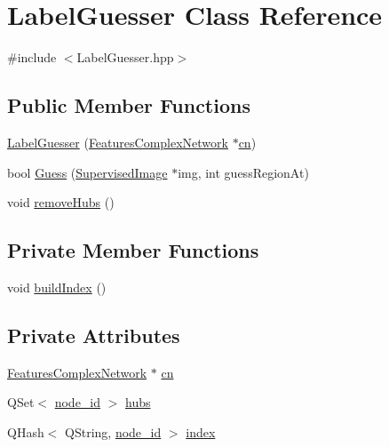 \hypertarget{class_label_guesser}{\section{Label\+Guesser Class Reference}
\label{class_label_guesser}
}


{\ttfamily \#include $<$Label\+Guesser.\+hpp$>$}

\subsection*{Public Member Functions}
\begin{DoxyCompactItemize}
\item 
\hyperlink{class_label_guesser_ad40858173b453bf95a7cd9798ff6a941}{Label\+Guesser} (\hyperlink{class_features_complex_network}{Features\+Complex\+Network} $\ast$\hyperlink{class_label_guesser_acdd5ba09b2a6aa6fadc4b64798bd4e75}{cn})
\item 
bool \hyperlink{class_label_guesser_a83c7361e8308a2347814a418c6165615}{Guess} (\hyperlink{class_supervised_image}{Supervised\+Image} $\ast$img, int guess\+Region\+At)
\item 
void \hyperlink{class_label_guesser_a34aabd99a651c08cd66df1ffa27767e5}{remove\+Hubs} ()
\end{DoxyCompactItemize}
\subsection*{Private Member Functions}
\begin{DoxyCompactItemize}
\item 
void \hyperlink{class_label_guesser_a28aeaaf6c7b4d8faeed2cd2f69da49a3}{build\+Index} ()
\end{DoxyCompactItemize}
\subsection*{Private Attributes}
\begin{DoxyCompactItemize}
\item 
\hyperlink{class_features_complex_network}{Features\+Complex\+Network} $\ast$ \hyperlink{class_label_guesser_acdd5ba09b2a6aa6fadc4b64798bd4e75}{cn}
\item 
Q\+Set$<$ \hyperlink{_complex_network_v2_8hpp_a8323334ca788fde39682469321590d52}{node\+\_\+id} $>$ \hyperlink{class_label_guesser_a9a1306e306ecf90e6d886a45a1ed16f7}{hubs}
\item 
Q\+Hash$<$ Q\+String, \hyperlink{_complex_network_v2_8hpp_a8323334ca788fde39682469321590d52}{node\+\_\+id} $>$ \hyperlink{class_label_guesser_ae88b5f0ad103084c7c8d7326c4bd7251}{index}
\end{DoxyCompactItemize}


